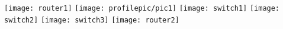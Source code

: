 

\date{{\footnotesize Last release \theversion\\%
    \texttt{\color{Gray}Generated \utccurrenttime}}}

\begin{titlepage}
    \centering
    \texttt{[image: router1]}
    \texttt{[image: profilepic/pic1]}
    \texttt{[image: switch1]}
    \texttt{[image: switch2]}
    \texttt{[image: switch3]}
    \texttt{[image: router2]}\par\vspace{1cm}
    {\scshape\Large \thetitle\par}
    \vspace{1.5cm}
    {\huge\bfseries \thesubject\par}
    \vspace{2cm}
    {\Large\itshape \theauthor\par}
    
    \vfill
    
    {\large \thedate\par}
\end{titlepage}
